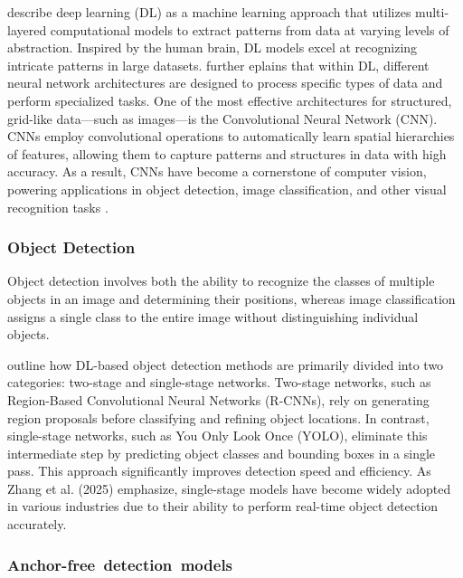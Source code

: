 \documentclass[a4paper,10pt,twocolumn]{article}
\numberwithin{figure}{section}
\numberwithin{table}{section}
\begin{document}
\cite{10589380} describe deep learning (DL) as a machine learning 
approach that utilizes multi-layered computational models to 
extract patterns from data at varying levels of abstraction. 
Inspired by the human brain, DL models excel at recognizing 
intricate patterns in large datasets.
\citep{SOORI202354} further eplains that within DL, 
different neural network architectures are designed to process
 specific types of data and perform specialized tasks. 
 One of the most effective architectures for structured, 
 grid-like data—such as images—is 
 the Convolutional Neural Network (CNN). 
 CNNs employ convolutional operations to automatically 
 learn spatial hierarchies of features, allowing them to 
 capture patterns and structures in data with high accuracy. 
 As a result, CNNs have become a cornerstone of computer vision, 
 powering applications in object detection, image classification, 
 and other visual recognition tasks \citep[pp. 326-328]{Goodfellow-et-al-2016}.

\vspace{0.3cm}
\subsubsection{Object Detection}
\vspace{0.3cm}
Object detection involves both the ability to recognize the classes of multiple objects in an image
and determining their positions, whereas image classification assigns a single 
class to the entire image without distinguishing individual objects.

\cite{ZhangLei2025RoMH} outline how DL-based object 
detection methods are primarily divided into two categories: 
two-stage and single-stage networks. 
Two-stage networks, such as Region-Based Convolutional Neural Networks (R-CNNs), 
rely on generating region proposals before classifying and refining object 
locations. In contrast, single-stage networks, such as You Only Look Once (YOLO),
 eliminate this intermediate step by predicting object classes
 and bounding boxes in a single pass. This approach significantly improves 
 detection speed and efficiency. As Zhang et al. (2025) emphasize, 
 single-stage models have become widely adopted in various industries 
 due to their ability to perform real-time object detection accurately.

 \vspace{0.3cm}
\subsubsection{\mbox{Anchor-free detection models}}
\vspace{0.3cm}
\end{document}
